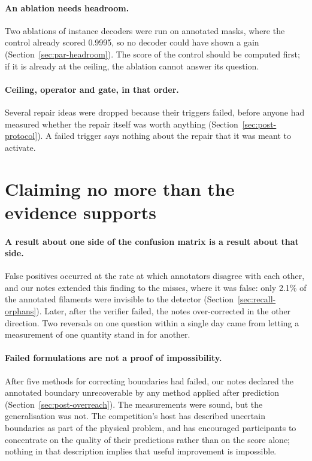 \paragraph{An ablation needs headroom.} Two ablations of instance decoders were run on annotated masks,
where the control already scored 0.9995, so no decoder could have shown a gain
(Section~\ref{sec:par-headroom}). The score of the control should be computed first; if it is already at
the ceiling, the ablation cannot answer its question.

\paragraph{Ceiling, operator and gate, in that order.} Several repair ideas were dropped because their
triggers failed, before anyone had measured whether the repair itself was worth anything
(Section~\ref{sec:post-protocol}). A failed trigger says nothing about the repair that it was meant to
activate.

\section{Claiming no more than the evidence supports}\label{sec:lessons-claims}

\paragraph{A result about one side of the confusion matrix is a result about that side.} False positives
occurred at the rate at which annotators disagree with each other, and our notes extended this finding
to the misses, where it was false: only 2.1\% of the annotated filaments were invisible to the detector
(Section~\ref{sec:recall-orphans}). Later, after the verifier failed, the notes over-corrected in the
other direction. Two reversals on one question within a single day came from letting a measurement of one
quantity stand in for another.

\paragraph{Failed formulations are not a proof of impossibility.} After five methods for correcting
boundaries had failed, our notes declared the annotated boundary unrecoverable by any method applied
after prediction (Section~\ref{sec:post-overreach}). The measurements were sound, but the generalisation
was not. The competition's host has described uncertain boundaries as part of the physical problem,
and has encouraged participants to concentrate on the quality of their predictions rather than on the
score alone; nothing in that description implies that useful improvement is impossible.

